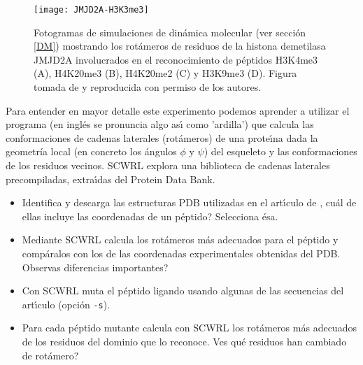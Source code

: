\begin{figure}
\begin{center} 
\texttt{[image: JMJD2A-H3K3me3]}
\caption%
{
Fotogramas de simulaciones de din\'{a}mica molecular (ver secci\'{o}n \ref{DM}) mostrando los rot\'{a}meros de residuos
de la histona demetilasa JMJD2A involucrados en el reconocimiento de p\'{e}ptidos H3K4me3 (A), H4K20me3 (B), H4K20me2 (C) y H3K9me3 (D).
Figura tomada de \citet{Ozboyaci2011} y reproducida con permiso de los autores.
}
\label{fig:JMJD2A}
\end{center}
\end{figure}


Para entender en mayor detalle este experimento podemos aprender a utilizar el programa 
 \citep{Bower1997}   
(en ingl\'{e}s se pronuncia algo as\'\i{} como 'ardilla') 
que calcula las conformaciones de cadenas laterales (rot\'{a}meros) de una prote\'\i{}na dada la geometr\'{i}a 
local (en concreto los \'{a}ngulos $\phi$ y $\psi$) del esqueleto y las conformaciones de los residuos vecinos.
SCWRL explora una biblioteca de cadenas laterales precompiladas, extra\'\i{}das del Protein Data Bank.

\begin{itemize}

\item Identifica y descarga las estructuras PDB utilizadas en el art\'\i{}culo de \citet{Reina2002},
cu\'{a}l de ellas incluye las coordenadas de un p\'{e}ptido? Selecciona \'{e}sa.

\item Mediante SCWRL calcula los rot\'{a}meros m\'{a}s adecuados para el p\'{e}ptido y comp\'{a}ralos con
los de las coordenadas experimentales obtenidas del PDB. Observas diferencias importantes?

\item Con SCWRL muta el p\'{e}ptido ligando usando algunas de las secuencias del art\'\i{}culo (opci\'{o}n \verb+-s+).

\item Para cada p\'{e}ptido mutante calcula con SCWRL los rot\'{a}meros m\'{a}s
adecuados de los residuos del dominio  
que lo reconoce. Ves qu\'{e} residuos han cambiado de rot\'{a}mero?

\end{itemize}

